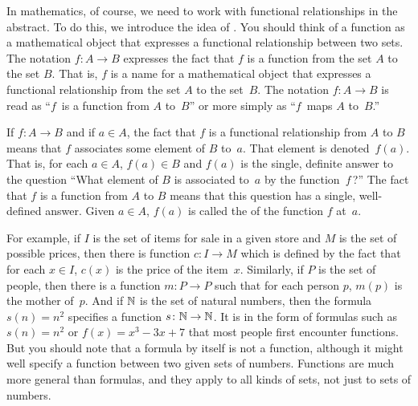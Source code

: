 In mathematics, of course, we need to work with functional
relationships in the abstract.  To do this, we introduce
the idea of .  You should think of a function
as a mathematical object that expresses a functional relationship
between two sets.  The notation $f\colon A\to B$ expresses
the fact that $f$ is a function from the set $A$ to the
set $B$.  That is, $f$ is a name for a mathematical object
that expresses a functional relationship from the set $A$ to the set~$B$.
The notation $f\colon A\to B$ is
read as ``$f$~is a function from $A$ to~$B$'' or more simply
as ``$f$~maps $A$ to~$B$.''

If $f\colon A\to B$ and if $a\in A$, the fact that $f$ is
a functional relationship from $A$ to $B$ means that $f$ associates
some element of $B$ to~$a$.  That element is denoted~$f(a)$.
That is, for each $a\in A$, $f(a)\in B$ and $f(a)$ is the single,
definite answer to the question ``What element of $B$ is
associated to~$a$ by the function~$f\,$?''  The fact that
$f$ is a function from $A$ to $B$ means that this question
has a single, well-defined answer.  Given $a\in A$,
$f(a)$ is called the 
of the function $f$ at~$a$.

For example, if $I$ is the set of items for sale in a
given store and $M$ is the set of possible prices,
then there is function $c\colon I\to M$ which
is defined by the fact that for each $x\in I$, $c(x)$
is the price of the item~$x$.  Similarly, if
$P$ is the set of people, then there is a function
$m\colon P\to P$ such that for each person $p$,
$m(p)$ is the mother of~$p$.  And if ${\mathbb N}$ is the set
of natural numbers, then the formula $s(n) = n^2$
specifies a function $s\colon {\mathbb N}\to{\mathbb N}$.  It is in the
form of formulas such as $s(n)=n^2$ or $f(x)=x^3-3x+7$ that
most people first encounter functions.  But you should
note that a formula by itself is not a function, although it might
well specify a function between two given sets of numbers.
Functions are much more general than formulas, and they
apply to all kinds of sets, not just to sets of numbers.

\medbreak

